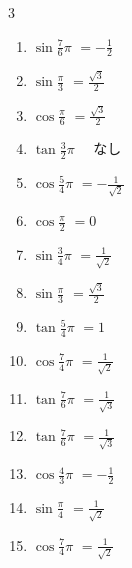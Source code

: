 \begin{multicols}{3}
\begin{enumerate}
  \item $\displaystyle \sin{\frac{7}{6}\pi}$
        $\displaystyle =-\frac{1}{2}$

  \item $\displaystyle \sin{\frac{\pi}{3}}$
        $\displaystyle =\frac{\sqrt{3}}{2}$

\columnbreak %

\resetques

  \item $\displaystyle \cos{\frac{\pi}{6}}$
        $\displaystyle =\frac{\sqrt{3}}{2}$

  \item $\displaystyle \tan{\frac{3}{2}\pi}$
        $\displaystyle \quad なし$

  \item $\displaystyle \cos{\frac{5}{4}\pi}$
        $\displaystyle =-\frac{1}{\sqrt{2}}$

  \item $\displaystyle \cos{\frac{\pi}{2}}$
        $\displaystyle =0$

  \item $\displaystyle \sin{\frac{3}{4}\pi}$
        $\displaystyle =\frac{1}{\sqrt{2}}$

  \item $\displaystyle \sin{\frac{\pi}{3}}$
        $\displaystyle =\frac{\sqrt{3}}{2}$

  \item $\displaystyle \tan{\frac{5}{4}\pi}$
        $\displaystyle =1$

  \item $\displaystyle \cos{\frac{7}{4}\pi}$
        $\displaystyle =\frac{1}{\sqrt{2}}$

  \item $\displaystyle \tan{\frac{7}{6}\pi}$
        $\displaystyle =\frac{1}{\sqrt{3}}$

  \item $\displaystyle \tan{\frac{7}{6}\pi}$
        $\displaystyle =\frac{1}{\sqrt{3}}$

  \item $\displaystyle \cos{\frac{4}{3}\pi}$
        $\displaystyle =-\frac{1}{2}$

  \item $\displaystyle \sin{\frac{\pi}{4}}$
        $\displaystyle =\frac{1}{\sqrt{2}}$

  \item $\displaystyle \cos{\frac{7}{4}\pi}$
        $\displaystyle =\frac{1}{\sqrt{2}}$


\end{enumerate}
\end{multicols}
